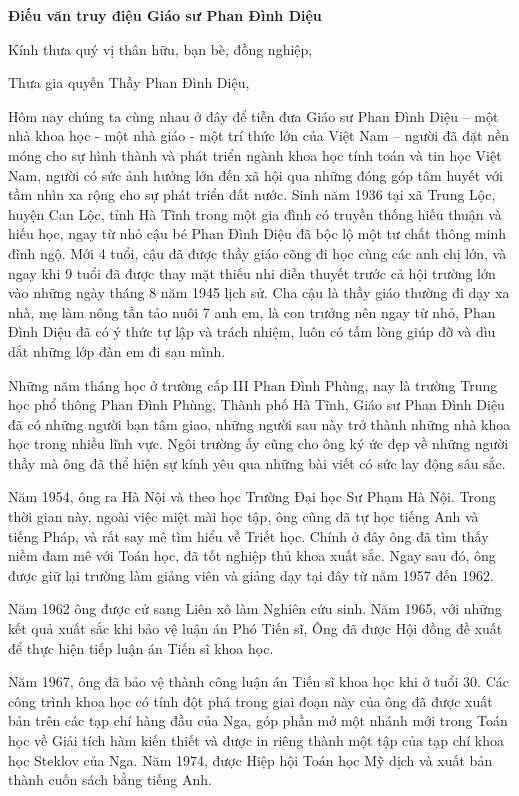 \begin{center}
{\bf Điếu văn truy điệu Giáo sư Phan Đình Diệu}
\end{center}

Kính thưa quý vị thân hữu, bạn bè, đồng nghiệp,

Thưa gia quyến Thầy Phan Đình Diệu, 

Hôm nay chúng ta cùng nhau ở đây để tiễn đưa Giáo sư Phan Đình Diệu – một nhà khoa học - một nhà giáo - một trí thức lớn của Việt Nam – người đã đặt nền móng cho sự hình thành và phát triển ngành khoa học tính toán và tin học Việt Nam, người có sức ảnh hưởng lớn đến xã hội qua những đóng góp tâm huyết với tầm nhìn xa rộng cho sự phát triển đất nước. 
Sinh năm 1936 tại xã Trung Lộc, huyện Can Lộc, tỉnh Hà Tĩnh trong một gia đình có truyền thống hiếu thuận và hiếu học, ngay từ nhỏ cậu bé Phan Đình Diệu đã bộc lộ một tư chất thông minh đĩnh ngộ. Mới 4 tuổi, cậu đã được thầy giáo cõng đi học cùng các anh chị lớn, và ngay khi 9 tuổi đã được thay mặt thiếu nhi diễn thuyết trước cả hội trường lớn vào những ngày tháng 8 năm 1945 lịch sử. Cha cậu là thầy giáo thường đi dạy xa nhà, mẹ làm nông tần tảo nuôi 7 anh em, là con trưởng nên ngay từ nhỏ, Phan Đình Diệu đã có ý thức tự lập và trách nhiệm, luôn có tấm lòng giúp đỡ và dìu dắt những lớp đàn em đi sau mình. 

Những năm tháng học ở trường cấp III Phan Đình Phùng, nay là trường Trung học phổ thông Phan Đình Phùng, Thành phố Hà Tĩnh, Giáo sư Phan Đình Diệu đã có những người bạn tâm giao, những người sau này trở thành những nhà khoa học trong nhiều lĩnh vực. Ngôi trường ấy cũng cho ông ký ức đẹp về những người thầy mà ông đã thể hiện sự kính yêu qua những bài viết có sức lay động sâu sắc. 

Năm 1954, ông ra Hà Nội và theo học Trường Đại học Sư Phạm Hà Nội. Trong thời gian này, ngoài việc miệt mài học tập, ông cũng đã tự học tiếng Anh và tiếng Pháp, và rất say mê tìm hiểu về Triết học. Chính ở đây ông đã tìm thấy niềm đam mê với Toán học, đã tốt nghiệp thủ khoa xuất sắc. Ngay sau đó, ông được giữ lại trường làm giảng viên và giảng dạy tại đây từ năm 1957 đến 1962.

Năm 1962 ông được cử sang Liên xô làm Nghiên cứu sinh. Năm 1965, với những kết quả xuất sắc khi bảo vệ luận án Phó Tiến sĩ, Ông đã được Hội đồng đề xuất để thực hiện tiếp luận án Tiến sĩ khoa học. 

Năm 1967, ông đã bảo vệ thành công luận án Tiến sĩ khoa học khi ở tuổi 30. Các công trình khoa học có tính đột phá trong giai đoạn này của ông đã được xuất bản trên các tạp chí hàng đầu của Nga, góp phần mở một nhánh mới trong Toán học về Giải tích hàm kiến thiết và được in riêng thành một tập của tạp chí khoa học Steklov của Nga. Năm 1974, được Hiệp hội Toán học Mỹ dịch và xuất bản thành cuốn sách bằng tiếng Anh.

